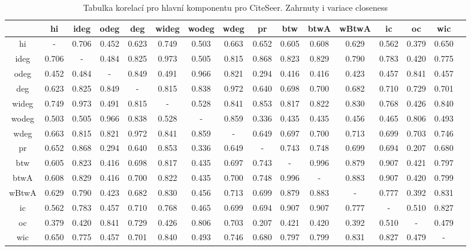 \documentclass{bakalarka}
\begin{document}
\begin{table}[!ht]
\centering
\caption{Tabulka korelací pro hlavní komponentu pro CiteSeer. Zahrnuty i variace closeness}
\label{tab:corr4}
\begin{sideways}
\begin{footnotesize}
\begin{tabular}{c|ccccccccccccccc}
\toprule
&hi  &ideg &odeg &deg  &wideg&wodeg&wdeg &pr   &btw  &btwA &wBtwA&ic   &oc   &wic\\
\midrule
hi   &  -  &0.706&0.452&0.623&0.749&0.503&0.663&0.652&0.605&0.608&0.629&0.562&0.379&0.650\\
ideg &0.706&  -  &0.484&0.825&0.973&0.505&0.815&0.868&0.823&0.829&0.790&0.783&0.420&0.775\\
odeg &0.452&0.484&  -  &0.849&0.491&0.966&0.821&0.294&0.416&0.416&0.423&0.457&0.841&0.457\\
deg  &0.623&0.825&0.849&  -  &0.815&0.838&0.972&0.640&0.698&0.700&0.682&0.710&0.729&0.701\\
wideg&0.749&0.973&0.491&0.815&  -  &0.528&0.841&0.853&0.817&0.822&0.830&0.768&0.426&0.840\\
wodeg&0.503&0.505&0.966&0.838&0.528&  -  &0.859&0.336&0.435&0.435&0.456&0.465&0.806&0.493\\
wdeg &0.663&0.815&0.821&0.972&0.841&0.859&  -  &0.649&0.697&0.700&0.713&0.699&0.703&0.746\\
pr   &0.652&0.868&0.294&0.640&0.853&0.336&0.649&  -  &0.743&0.748&0.699&0.694&0.207&0.680\\
btw  &0.605&0.823&0.416&0.698&0.817&0.435&0.697&0.743&  -  &0.996&0.879&0.907&0.421&0.797\\
btwA &0.608&0.829&0.416&0.700&0.822&0.435&0.700&0.748&0.996&  -  &0.883&0.907&0.420&0.799\\
wBtwA&0.629&0.790&0.423&0.682&0.830&0.456&0.713&0.699&0.879&0.883&  -  &0.777&0.392&0.831\\
ic   &0.562&0.783&0.457&0.710&0.768&0.465&0.699&0.694&0.907&0.907&0.777&  -  &0.510&0.827\\
oc   &0.379&0.420&0.841&0.729&0.426&0.806&0.703&0.207&0.421&0.420&0.392&0.510&  -  &0.479\\
wic  &0.650&0.775&0.457&0.701&0.840&0.493&0.746&0.680&0.797&0.799&0.831&0.827&0.479&  -  \\
\bottomrule
\end{tabular}
\end{footnotesize}
\end{sideways}
\end{table}
\end{document}
